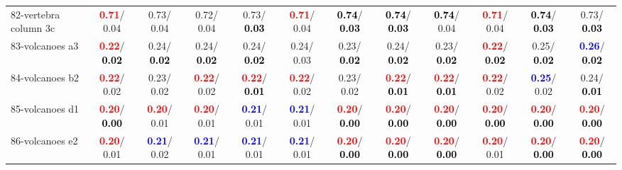 \begin{table}[h]
\begin{center}
{\begin{tabular}{lc|c|c|c|c|c|c|c|c|c|c}
82-vertebra column 3c & \textcolor{red}{\textbf{  0.71}}/  0.04 &   0.73/  0.04 &   0.72/  0.04 &   0.73/\textcolor{black}{\textbf{  0.03}} & \textcolor{red}{\textbf{  0.71}}/  0.04 & \textcolor{black}{\textbf{  0.74}}/\textcolor{black}{\textbf{  0.03}} & \textcolor{black}{\textbf{  0.74}}/\textcolor{black}{\textbf{  0.03}} & \textcolor{black}{\textbf{  0.74}}/  0.04 & \textcolor{red}{\textbf{  0.71}}/  0.04 & \textcolor{black}{\textbf{  0.74}}/\textcolor{black}{\textbf{  0.03}} &   0.73/\textcolor{black}{\textbf{  0.03}} \\
83-volcanoes a3 & \textcolor{red}{\textbf{  0.22}}/\textcolor{black}{\textbf{  0.02}} &   0.24/\textcolor{black}{\textbf{  0.02}} &   0.24/\textcolor{black}{\textbf{  0.02}} &   0.24/\textcolor{black}{\textbf{  0.02}} &   0.24/  0.03 &   0.23/\textcolor{black}{\textbf{  0.02}} &   0.24/\textcolor{black}{\textbf{  0.02}} &   0.23/\textcolor{black}{\textbf{  0.02}} & \textcolor{red}{\textbf{  0.22}}/\textcolor{black}{\textbf{  0.02}} &   0.25/\textcolor{black}{\textbf{  0.02}} & \textcolor{blue}{\textbf{  0.26}}/\textcolor{black}{\textbf{  0.02}} \\
84-volcanoes b2 & \textcolor{red}{\textbf{  0.22}}/  0.02 &   0.23/  0.02 & \textcolor{red}{\textbf{  0.22}}/  0.02 & \textcolor{red}{\textbf{  0.22}}/\textcolor{black}{\textbf{  0.01}} & \textcolor{red}{\textbf{  0.22}}/  0.02 &   0.23/  0.02 & \textcolor{red}{\textbf{  0.22}}/\textcolor{black}{\textbf{  0.01}} & \textcolor{red}{\textbf{  0.22}}/\textcolor{black}{\textbf{  0.01}} & \textcolor{red}{\textbf{  0.22}}/  0.02 & \textcolor{blue}{\textbf{  0.25}}/  0.02 &   0.24/\textcolor{black}{\textbf{  0.01}} \\
85-volcanoes d1 & \textcolor{red}{\textbf{  0.20}}/\textcolor{black}{\textbf{  0.00}} & \textcolor{red}{\textbf{  0.20}}/  0.01 & \textcolor{red}{\textbf{  0.20}}/  0.01 & \textcolor{blue}{\textbf{  0.21}}/  0.01 & \textcolor{blue}{\textbf{  0.21}}/  0.01 & \textcolor{red}{\textbf{  0.20}}/\textcolor{black}{\textbf{  0.00}} & \textcolor{red}{\textbf{  0.20}}/\textcolor{black}{\textbf{  0.00}} & \textcolor{red}{\textbf{  0.20}}/\textcolor{black}{\textbf{  0.00}} & \textcolor{red}{\textbf{  0.20}}/\textcolor{black}{\textbf{  0.00}} & \textcolor{red}{\textbf{  0.20}}/\textcolor{black}{\textbf{  0.00}} & \textcolor{red}{\textbf{  0.20}}/\textcolor{black}{\textbf{  0.00}} \\ \hline
86-volcanoes e2 & \textcolor{red}{\textbf{  0.20}}/  0.01 & \textcolor{blue}{\textbf{  0.21}}/  0.02 & \textcolor{blue}{\textbf{  0.21}}/  0.01 & \textcolor{blue}{\textbf{  0.21}}/  0.01 & \textcolor{blue}{\textbf{  0.21}}/  0.01 & \textcolor{red}{\textbf{  0.20}}/\textcolor{black}{\textbf{  0.00}} & \textcolor{red}{\textbf{  0.20}}/\textcolor{black}{\textbf{  0.00}} & \textcolor{red}{\textbf{  0.20}}/\textcolor{black}{\textbf{  0.00}} & \textcolor{red}{\textbf{  0.20}}/  0.01 & \textcolor{red}{\textbf{  0.20}}/\textcolor{black}{\textbf{  0.00}} & \textcolor{red}{\textbf{  0.20}}/\textcolor{black}{\textbf{  0.00}} \\

\end{tabular}}
\end{center}
\end{table}
